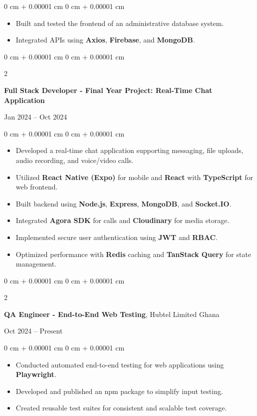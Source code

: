\documentclass[10pt, letterpaper]{article}
\newenvironment{highlights}{
    \begin{itemize}[
        topsep=0.10 cm,
        parsep=0.10 cm,
        partopsep=0pt,
        itemsep=0pt,
        leftmargin=0 cm + 10pt
    ]
}{
    \end{itemize}
} %
\newenvironment{onecolentry}{
    \begin{adjustwidth}{
        0 cm + 0.00001 cm
    }{
        0 cm + 0.00001 cm
    }
}{
    \end{adjustwidth}
} %
\newenvironment{twocolentry}[2][]{
    \onecolentry
    \def\secondColumn{#2}
    \setcolumnwidth{\fill, 4.5 cm}
    \begin{paracol}{2}
}{
    \switchcolumn \raggedleft \secondColumn
    \end{paracol}
    \endonecolentry
} %
\begin{document}
\vspace{0.10 cm}
\begin{onecolentry}
    \begin{highlights}
        \item Built and tested the frontend of an administrative database system.
        \item Integrated APIs using \textbf{Axios}, \textbf{Firebase}, and \textbf{MongoDB}.
    \end{highlights}
\end{onecolentry}

\vspace{0.30 cm}

\begin{twocolentry}{Jan 2024 – Oct 2024}
    \textbf{Full Stack Developer - Final Year Project: Real-Time Chat Application}
\end{twocolentry}

\vspace{0.10 cm}
\begin{onecolentry}
    \begin{highlights}
        \item Developed a real-time chat application supporting messaging, file uploads,
        audio recording, and voice/video calls.
        \item Utilized \textbf{React Native (Expo)} for mobile and \textbf{React} with
        \textbf{TypeScript} for web frontend.
        \item Built backend using \textbf{Node.js}, \textbf{Express}, \textbf{MongoDB}, and
        \textbf{Socket.IO}.
        \item Integrated \textbf{Agora SDK} for calls and \textbf{Cloudinary} for media
        storage.
        \item Implemented secure user authentication using \textbf{JWT} and \textbf{RBAC}.
        \item Optimized performance with \textbf{Redis} caching and \textbf{TanStack Query}
        for state management.
    \end{highlights}
\end{onecolentry}

\vspace{0.30 cm}

\begin{twocolentry}{Oct 2024 – Present}
    \textbf{QA Engineer - End-to-End Web Testing}, Hubtel Limited Ghana
\end{twocolentry}

\vspace{0.10 cm}
\begin{onecolentry}
    \begin{highlights}
        \item Conducted automated end-to-end testing for web applications using
        \textbf{Playwright}.
        \item Developed and published an npm package to simplify input testing.
        \item Created reusable test suites for consistent and scalable test coverage.
    \end{highlights}
\end{onecolentry}
\end{document}
